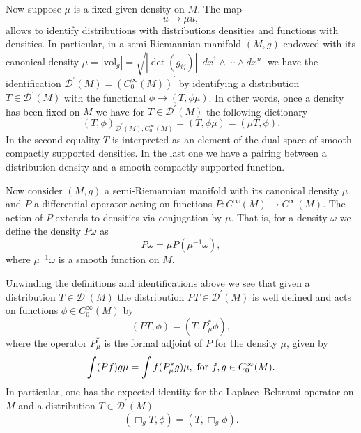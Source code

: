 \documentclass[12pt,reqno]{amsart}
\numberwithin{equation}{section}
\newcommand{\bg}{\Box_{g}}
\theoremstyle{definition}
\theoremstyle{plain}
\theoremstyle{definition}
\theoremstyle{definition}
\begin{document}
\bigskip

Now suppose $\mu$ is a fixed given density on $M$. The map
\begin{equation}
    u \to \mu u,
\end{equation}
allows to identify distributions with distributions densities and functions with densities. In particular, in a semi-Riemannian manifold $(M, g)$ endowed with its canonical density $\mu= |\mathrm{vol}_g| = \sqrt{|\det(g_{ij})|}\, |dx^1 \wedge \cdots \wedge dx^n|$ we have the identification $\mathcal{D}^\prime (M) = (C^\infty_0(M))^\prime$ by identifying a distribution $T \in  \mathcal{D}^\prime (M)$ with the functional $\phi \to (T, \phi \mu)$. In other words, once a density has been fixed on $M$ we have for $T \in  \mathcal{D}^\prime (M)$ the following dictionary
\begin{equation}
    (T, \phi)_{\mathcal{D}^\prime (M), C^\infty_0(M)}=(T , \phi \mu)=(\mu T, \phi).
\end{equation}
In the second equality $T$ is interpreted  as an element of the dual space of smooth compactly supported densities. In the last one we have a pairing between a distribution density and a smooth compactly supported function.

Now consider $(M,g)$ a semi-Riemannian manifold with its canonical density $\mu$ and $P$ a differential operator acting on functions $P: C^\infty(M) \to C^\infty(M)$. The action of $P$ extends to densities via conjugation by $\mu$. That is, for a density $\omega $ we define the density $P \omega$ as
\begin{equation}
    P \omega= \mu P(\mu^{-1}\omega),
\end{equation}
where $\mu^{-1} \omega$ is a smooth function on $M$.

Unwinding the definitions and identifications above we see that given a distribution $T \in \mathcal{D}^\prime(M)$ the distribution $PT \in \mathcal{D}^\prime (M) $ is well defined and acts on functions $\phi \in C^\infty_0(M)$ by
\begin{equation}
    (PT, \phi)=(T, P^*_\mu \phi),
\end{equation}
where the operator $P^*_\mu$ is the formal adjoint of $P$ for the density $\mu$, given by
$$
\int (Pf) g \mu = \int f (P^*_\mu g) \mu, \textnormal{ for } f,g \in C^\infty_0(M).
$$
In particular, one has the expected identity for the Laplace--Beltrami operator on $M$ and a distribution $T \in \mathcal{D}^\prime(M)$
\begin{equation}
    (\bg T,\phi)=(T, \bg \phi).
\end{equation}






\end{document}
